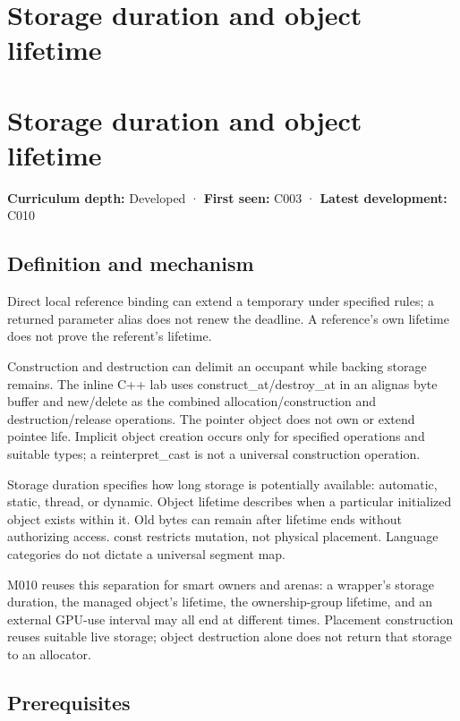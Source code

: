 \hypertarget{appendix-0b104bcba06b}{}
\section*{Storage duration and object lifetime}
\section{Storage duration and object lifetime}\label{storage-duration-and-object-lifetime}

\textbf{Curriculum depth:} Developed · \textbf{First seen:} C003 · \textbf{Latest development:} C010

\subsection{Definition and mechanism}\label{definition-and-mechanism}

Direct local reference binding can extend a temporary under specified rules; a returned parameter alias does not renew the deadline. A reference's own lifetime does not prove the referent's lifetime.

Construction and destruction can delimit an occupant while backing storage remains. The inline C++ lab uses construct\_at/destroy\_at in an alignas byte buffer and new/delete as the combined allocation/construction and destruction/release operations. The pointer object does not own or extend pointee life. Implicit object creation occurs only for specified operations and suitable types; a reinterpret\_cast is not a universal construction operation.

Storage duration specifies how long storage is potentially available: automatic, static, thread, or dynamic. Object lifetime describes when a particular initialized object exists within it. Old bytes can remain after lifetime ends without authorizing access. const restricts mutation, not physical placement. Language categories do not dictate a universal segment map.

M010 reuses this separation for smart owners and arenas: a wrapper's storage duration, the managed object's lifetime, the ownership-group lifetime, and an external GPU-use interval may all end at different times. Placement construction reuses suitable live storage; object destruction alone does not return that storage to an allocator.

\subsection{Prerequisites}\label{prerequisites}

